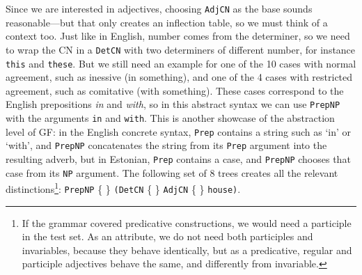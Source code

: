 \documentclass[11pt]{article}
\def\t#1{\texttt{#1}}
\begin{document}

\noindent Since we are interested in adjectives, choosing \t{AdjCN} as
the base sounds reasonable---but that only creates an inflection
table, so we must think of a context too. Just like in English, number
comes from the determiner, so we need to wrap the CN in a \t{DetCN}
with two determiners of different number, for instance \t{this} and
\t{these}. But we still need an example for one of the 10 cases with
normal agreement, such as inessive (in something), and one of the 4
cases with restricted agreement, such as comitative (with something).
These cases correspond to the English prepositions \emph{in} and \emph{with},
so in this abstract syntax we can use \t{PrepNP} with the arguments
\t{in} and \t{with}. This is another showcase of the abstraction level
of GF: in the English concrete syntax, \t{Prep} contains a string
such as `in' or `with', and \t{PrepNP} concatenates the string from its
\t{Prep} argument into the resulting adverb, but in Estonian, \t{Prep}
contains a case, and \t{PrepNP} chooses that case from its \t{NP} argument.
The following set of 8 trees creates all the relevant
distinctions\footnote{If the grammar covered predicative
constructions, we would need a participle in the test set. As an
attribute, we do not need both participles and invariables,
because they behave identically, but as a predicative, regular and
participle adjectives behave the same, and differently from
invariable.}: 
 \t{PrepNP} \{  \}
             {\tt (DetCN} \{  \} 
             {\tt AdjCN}  \{ \} 
             {\tt house)}.

\end{document}
